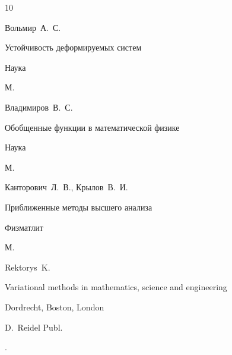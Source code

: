 \begin{thebibliography}{10}
 


\by Вольмир~А.~С. 

\book  Устойчивость деформируемых систем


\publ Наука

\publaddr М.




 

 



 


\by Владимиров~В.~С. 

\book Обобщенные функции в математической физике


\publ Наука

\publaddr М.












\by Канторович~Л.~В., Крылов~В.~И.

\book  Приближенные методы высшего анализа


\publ Физматлит

\publaddr М.












\by Rektorys~K.

\book Variational methods in mathematics, science and engineering


\publaddr Dordrecht, Boston,  London

\publ D.~Reidel Publ. 



\moreref

. \nofrills






\end{thebibliography}
